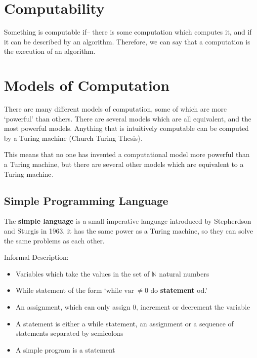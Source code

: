 
\section*{Computability}

Something is computable if-- there is some computation which computes it, and if it can be described by an algorithm.
 Therefore, we can say that a computation is the execution of an algorithm.

\section*{Models of Computation}

There are many different models of computation, some of which are more `powerful' than others. There are several models
 which are all equivalent, and the most powerful models. Anything that is intuitively computable can be computed by a
 Turing machine (Church-Turing Thesis).

This means that no one has invented a computational model more powerful than a Turing machine, but there are several
 other models which are equivalent to a Turing machine.

\subsection*{Simple Programming Language}

The \textbf{simple language} is a small imperative language introduced by Stepherdson and Sturgis in 1963. it has the
 same power as a Turing machine, so they can solve the same problems as each other.

Informal Description:
\begin{itemize}
  \item Variables which take the values in the set of $\mathbb{N}$ natural numbers
  \item While statement of the form `while $\mathrm{var\ } \neq 0$ do \textbf{statement} od.'
  \item An assignment, which can only assign $0$, increment or decrement the variable
  \item A statement is either a while statement, an assignment or a sequence of statements separated by semicolons
  \item A simple program is a statement
\end{itemize}

